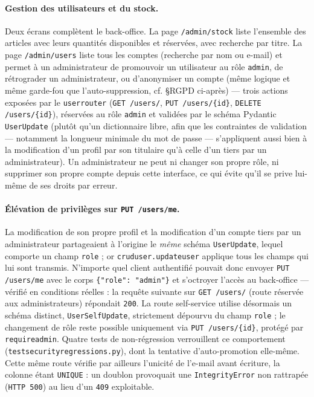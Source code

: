 \documentclass[12pt, a4paper]{report}
\renewcommand{\_}{\origunderscore\allowbreak}
\begin{document}
\paragraph{Gestion des utilisateurs et du stock.} Deux écrans complètent le back-office. La page \texttt{/admin/stock} liste l'ensemble des articles avec leurs quantités disponibles et réservées, avec recherche par titre. La page \texttt{/admin/users} liste tous les comptes (recherche par nom ou e-mail) et permet à un administrateur de promouvoir un utilisateur au rôle \texttt{admin}, de rétrograder un administrateur, ou d'anonymiser un compte (même logique et même garde-fou que l'auto-suppression, cf. \S RGPD ci-après) — trois actions exposées par le \texttt{user\_router} (\texttt{GET /users/}, \texttt{PUT /users/\{id\}}, \texttt{DELETE /users/\{id\}}), réservées au rôle \texttt{admin} et validées par le schéma Pydantic \texttt{UserUpdate} (plutôt qu'un dictionnaire libre, afin que les contraintes de validation — notamment la longueur minimale du mot de passe — s'appliquent aussi bien à la modification d'un profil par son titulaire qu'à celle d'un tiers par un administrateur). Un administrateur ne peut ni changer son propre rôle, ni supprimer son propre compte depuis cette interface, ce qui évite qu'il se prive lui-même de ses droits par erreur.

\paragraph{Élévation de privilèges sur \texttt{PUT /users/me}.} La modification de son propre profil et la modification d'un compte tiers par un administrateur partageaient à l'origine le \emph{même} schéma \texttt{UserUpdate}, lequel comporte un champ \texttt{role} ; or \texttt{crud\_user.update\_user} applique tous les champs qui lui sont transmis. N'importe quel client authentifié pouvait donc envoyer \texttt{PUT /users/me} avec le corps \texttt{\{"role": "admin"\}} et s'octroyer l'accès au back-office — vérifié en conditions réelles : la requête suivante sur \texttt{GET /users/} (route réservée aux administrateurs) répondait \texttt{200}. La route self-service utilise désormais un schéma distinct, \texttt{UserSelfUpdate}, strictement dépourvu du champ \texttt{role} ; le changement de rôle reste possible uniquement via \texttt{PUT /users/\{id\}}, protégé par \texttt{require\_admin}. Quatre tests de non-régression verrouillent ce comportement (\texttt{test\_security\_regressions.py}), dont la tentative d'auto-promotion elle-même. Cette même route vérifie par ailleurs l'unicité de l'e-mail avant écriture, la colonne étant \texttt{UNIQUE} : un doublon provoquait une \texttt{IntegrityError} non rattrapée (\texttt{HTTP 500}) au lieu d'un \texttt{409} exploitable.
\end{document}

